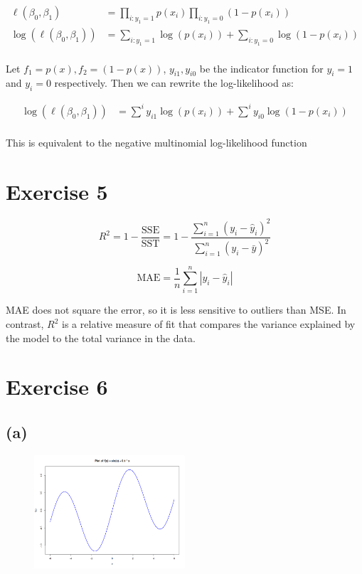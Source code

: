 \documentclass{article}
\begin{document}
\begin{align*}
\ell(\beta_0, \beta_1) &= \prod_{i:y_1 = 1}p(x_i) \prod_{i:y_1 = 0}(1-p(x_i)) \\
\log (\ell(\beta_0, \beta_1)) &= \sum_{i:y_1 = 1}\log(p(x_i)) + \sum_{i:y_1 = 0}\log(1-p(x_i)) \\
\end{align*}

Let \(f_1 = p(x), f_2 = (1-p(x))\), \(y_{i1}, y_{i0}\) be the indicator function for \(y_i = 1\) and \(y_i = 0\) respectively. Then we can rewrite the log-likelihood as:

\begin{align*}
\log (\ell(\beta_0, \beta_1)) &= \sum^{i}y_{i1} \log(p(x_i)) + \sum^i y_{i0} \log(1-p(x_i)) \\
\end{align*}

This is equivalent to the negative multinomial log-likelihood function 

\section*{Exercise 5}
\[
R^2 = 1 - \frac{\text{SSE}}{\text{SST}} = 1 - \frac{\sum_{i=1}^n (y_i - \hat{y}_i)^2}{\sum_{i=1}^n (y_i - \bar{y})^2}\]

\[
\text{MAE} = \frac{1}{n}\sum_{i=1}^n |y_i - \hat{y}_i|
\]

MAE does not square the error, so it is less sensitive to outliers than MSE. In contrast, \(R^2\) is a relative measure of fit that compares the variance explained by the model to the total variance in the data.


\newpage
\section*{Exercise 6}

\subsection*{(a)}
\begin{figure}[h]
    \centering
    \includegraphics[width=0.5\textwidth]{figs/q6a.png}
    \caption{}
    \label{fig:q6a}
\end{figure}
\end{document}
